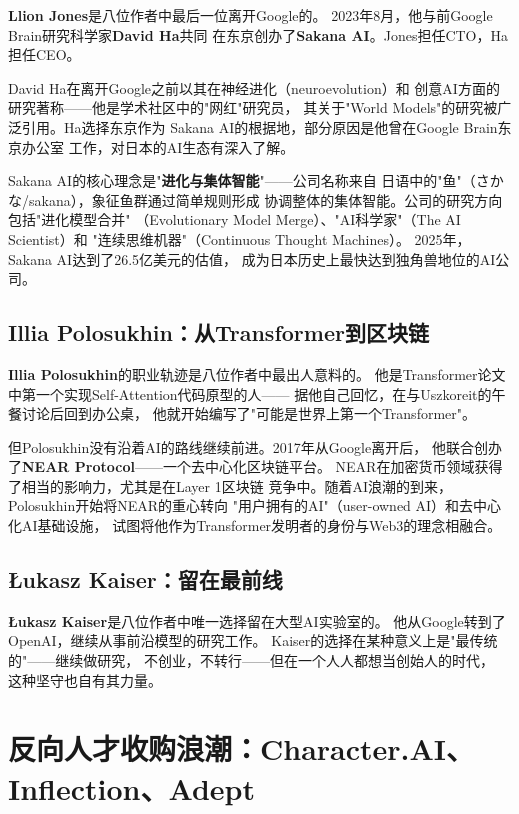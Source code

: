 \textbf{Llion Jones}是八位作者中最后一位离开Google的。
2023年8月，他与前Google Brain研究科学家\textbf{David Ha}共同
在东京创办了\textbf{Sakana AI}。Jones担任CTO，Ha担任CEO。

David Ha在离开Google之前以其在神经进化（neuroevolution）和
创意AI方面的研究著称——他是学术社区中的"网红"研究员，
其关于"World Models"的研究被广泛引用。Ha选择东京作为
Sakana AI的根据地，部分原因是他曾在Google Brain东京办公室
工作，对日本的AI生态有深入了解。

Sakana AI的核心理念是"\textbf{进化与集体智能}"——公司名称来自
日语中的"鱼"（さかな/sakana），象征鱼群通过简单规则形成
协调整体的集体智能。公司的研究方向包括"进化模型合并"
（Evolutionary Model Merge）、"AI科学家"（The AI Scientist）和
"连续思维机器"（Continuous Thought Machines）。
2025年，Sakana AI达到了26.5亿美元的估值，
成为日本历史上最快达到独角兽地位的AI公司。

\subsection{Illia Polosukhin：从Transformer到区块链}

\textbf{Illia Polosukhin}的职业轨迹是八位作者中最出人意料的。
他是Transformer论文中第一个实现Self-Attention代码原型的人——
据他自己回忆，在与Uszkoreit的午餐讨论后回到办公桌，
他就开始编写了"可能是世界上第一个Transformer"。

但Polosukhin没有沿着AI的路线继续前进。2017年从Google离开后，
他联合创办了\textbf{NEAR Protocol}——一个去中心化区块链平台。
NEAR在加密货币领域获得了相当的影响力，尤其是在Layer 1区块链
竞争中。随着AI浪潮的到来，Polosukhin开始将NEAR的重心转向
"用户拥有的AI"（user-owned AI）和去中心化AI基础设施，
试图将他作为Transformer发明者的身份与Web3的理念相融合。

\subsection{{\L}ukasz Kaiser：留在最前线}

\textbf{{\L}ukasz Kaiser}是八位作者中唯一选择留在大型AI实验室的。
他从Google转到了OpenAI，继续从事前沿模型的研究工作。
Kaiser的选择在某种意义上是"最传统的"——继续做研究，
不创业，不转行——但在一个人人都想当创始人的时代，
这种坚守也自有其力量。


\section{反向人才收购浪潮：Character.AI、Inflection、Adept}
\label{sec:acqui-hire}

